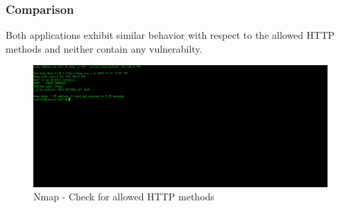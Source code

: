 \subsubsection{Comparison}
Both applications exhibit similar behavior with respect to the allowed HTTP methods and neither contain any vulnerabilty.
\\
\begin{figure}[ht]
	\centering
		\includegraphics[width=.8\linewidth]{figures/OTG-CONFIG-006.png}
		\caption{Nmap - Check for allowed HTTP methods}
	\label{fig:nmap_http_methods}
\end{figure}

\clearpage